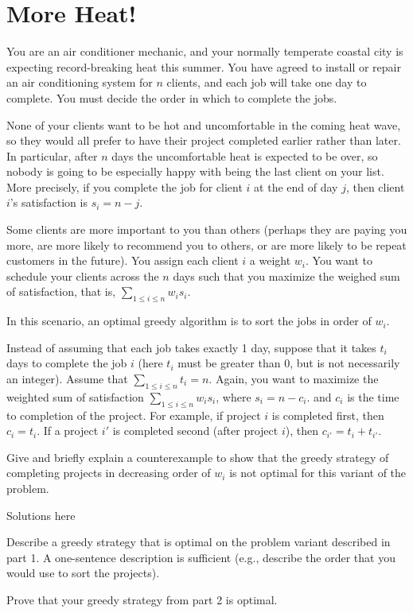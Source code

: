 \documentclass[11pt,fleqn]{exam}
\newenvironment{soln}{\color{solnblue}}{}
\newif\ifsolutions\solutionsfalse
\begin{document}
\section{More Heat!}

You are an air conditioner mechanic, and your normally temperate coastal city is expecting record-breaking heat this summer. You have agreed to install or repair an air conditioning system for $n$ clients, and each job will take one day to complete. You must decide the order in which to complete the jobs.

None of your clients want to be hot and uncomfortable in the coming heat wave, so they would all prefer to have their project completed earlier rather than later. In particular, after $n$ days the uncomfortable heat is expected to be over, so nobody is going to be especially happy with being the last client on your list. More precisely, if you complete the job for client $i$ at the end of day $j$, then client $i$'s satisfaction is $s_i = n-j$.

Some clients are more important to you than others (perhaps they are paying you more, are more likely to recommend you to others, or are more likely to be repeat customers in the future). You assign each client $i$ a weight $w_i$. You want to schedule your clients across the $n$ days such that you maximize the weighed sum of satisfaction, that is, $\sum_{1 \le i \le n} w_i s_i$.

In this scenario, an optimal greedy algorithm is to sort the jobs in order of $w_i$.

\begin{questions}
    \question[3] Instead of assuming that each job takes exactly 1 day, suppose that it takes $t_i$ days to complete the job $i$ (here $t_i$ must be greater than 0, but is not necessarily an integer). Assume that $\sum_{1 \leq i \leq n}t_i = n$. Again, you want to maximize the weighted sum of satisfaction $\sum_{1 \leq i \leq n} w_i s_i$, where $s_i = n-c_i$. and $c_i$ is the time to completion of the project. For example, if project $i$ is completed first, then $c_i = t_i$. If a project $i'$ is completed second (after project $i$), then $c_{i'} =t_i + t_{i'}$.
	
	Give and briefly explain a counterexample to show that the greedy strategy of completing projects in decreasing order of $w_i$ is not optimal for this variant of the problem.

    \begin{soln}
        Solutions here
    \end{soln}

    \ifsolutions  \fi

    \question[2] Describe a greedy strategy that is optimal on the problem variant described in part 1. A one-sentence description is sufficient (e.g., describe the order that you would use to sort the projects).
     \ifsolutions  \fi

    \question[5] Prove that your greedy strategy from part 2 is optimal.
     \ifsolutions  \else \newpage \fi

\end{questions}
\end{document}
